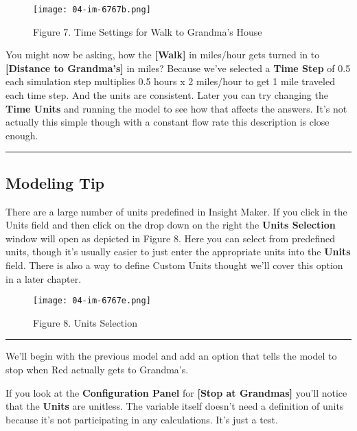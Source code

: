 \documentclass[]{memoir}
\let\Oldincludegraphics\includegraphics
\renewcommand{\includegraphics}[1]{\Oldincludegraphics[max size={\textwidth}{\textheight}]{#1}}
\newcommand{\p}[1]{\textbf{{[}#1{]}}}
\renewcommand{\u}[1]{\textbf{#1}}
\renewcommand{\a}[1]{\textbf{#1}}
\begin{document}
\begin{figure}[htbp]
\centering
\texttt{[image: 04-im-6767b.png]}
\caption{Figure 7. Time Settings for Walk to Grandma's House}
\end{figure}

You might now be asking, how the \p{Walk} in miles/hour gets turned in
to \p{Distance to Grandma's} in miles? Because we've selected a
\a{Time Step} of 0.5 each simulation step multiplies 0.5 hours x 2
miles/hour to get 1 mile traveled each time step. And the units are
consistent. Later you can try changing the \u{Time Units} and running
the model to see how that affects the answers. It's not actually this
simple though with a constant flow rate this description is close
enough.

\begin{center}\rule{3in}{0.4pt}\end{center}

\subsection{Modeling Tip}

There are a large number of units predefined in Insight Maker. If you
click in the Units field and then click on the drop down on the right
the \u{Units Selection} window will open as depicted in Figure 8. Here
you can select from predefined units, though it's usually easier to just
enter the appropriate units into the \a{Units} field. There is also a
way to define Custom Units thought we'll cover this option in a later
chapter.

\begin{figure}[htbp]
\centering
\texttt{[image: 04-im-6767e.png]}
\caption{Figure 8. Units Selection}
\end{figure}

\begin{center}\rule{3in}{0.4pt}\end{center}

\FloatBarrier 

\begin{model}[frametitle={Model: Stopping At Grandma's}] 

 We'll begin with the previous model and add an option that tells the model to stop when Red actually gets to Grandma's.




 \end{model}

If you look at the \u{Configuration Panel} for \p{Stop at Grandmas}
you'll notice that the \a{Units} are unitless. The variable itself
doesn't need a definition of units because it's not participating in any
calculations. It's just a test.
\end{document}
